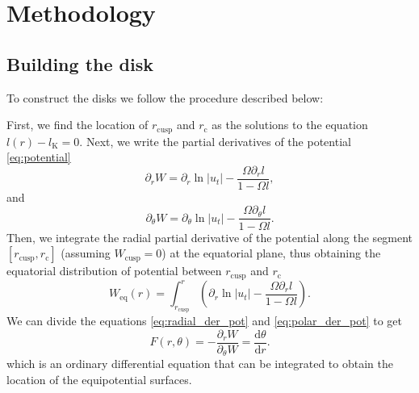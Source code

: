 \documentclass{aa}
\begin{document}
\section{Methodology}

\subsection{Building the disk}

To construct the disks we follow the procedure described below:

First, we find the location of $r_{\mathrm{cusp}}$ and $r_{\mathrm{c}}$ as the solutions to the equation $l(r) - l_{\mathrm{K}} = 0$.
Next, we write the partial derivatives of the potential \eqref{eq:potential}
\begin{equation}\label{eq:radial_der_pot}
\partial_r W = \partial_r \ln|u_t| - \frac{\Omega \partial_rl}{1 - \Omega l},
\end{equation}
and
\begin{equation}\label{eq:polar_der_pot}
\partial_{\theta} W = \partial_{\theta} \ln|u_t| - \frac{\Omega \partial_{\theta}l}{1 - \Omega l}.
\end{equation}
Then, we integrate the radial partial derivative of the potential along the segment $[r_{\mathrm{cusp}}, r_{\mathrm{c}}]$ (assuming $W_{\mathrm{cusp}} = 0$) at the equatorial plane, thus obtaining the equatorial distribution of potential between $r_{\mathrm{cusp}}$ and $r_{\mathrm{c}}$
\begin{equation}\label{eq:equatorial_pot}
W_{\mathrm{eq}}(r) = \int^{r}_{r_{\mathrm{cusp}}}\left(\partial_r \ln|u_t| - \frac{\Omega \partial_rl}{1 - \Omega l}\right).
\end{equation}
We can divide the equations \eqref{eq:radial_der_pot} and \eqref{eq:polar_der_pot} \citep{Qian:2009} to get
\begin{equation}\label{eq:F}
F(r, \theta) = -\frac{\partial_r W}{\partial_{\theta} W} = \frac{\mathrm{d}\theta}{\mathrm{d}r}.
\end{equation}
which is an ordinary differential equation that can be integrated to obtain the location of the equipotential surfaces.
\end{document}
